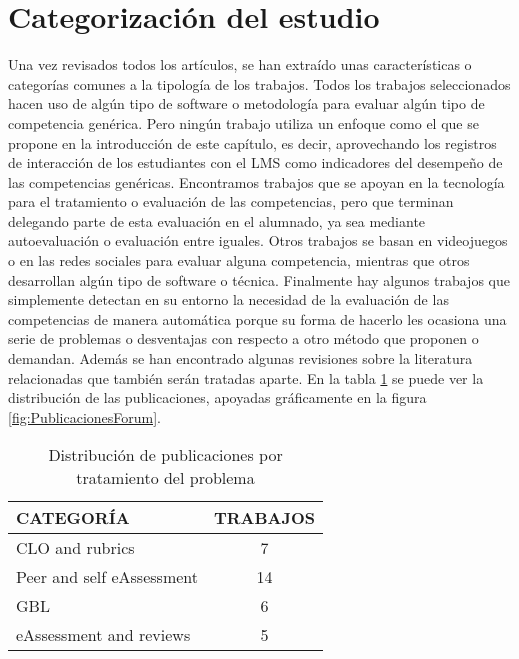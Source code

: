 \section{Categorización del estudio}

Una vez revisados todos los artículos, se han extraído unas características o categorías comunes a la tipología de los trabajos. Todos los trabajos seleccionados hacen uso de algún tipo de software o metodología para evaluar algún tipo de competencia genérica. Pero ningún trabajo utiliza un enfoque como el que se propone en la introducción de este capítulo, es decir, aprovechando los registros de interacción de los estudiantes con el LMS como indicadores del desempeño de las competencias genéricas. Encontramos trabajos que se apoyan en la tecnología para el tratamiento o evaluación de las competencias, pero que terminan delegando parte de esta evaluación en el alumnado, ya sea mediante autoevaluación o evaluación entre iguales. Otros trabajos se basan en videojuegos o en las redes sociales para evaluar alguna competencia, mientras que otros desarrollan algún tipo de software o técnica. Finalmente hay algunos trabajos que simplemente detectan en su entorno la necesidad de la evaluación de las competencias de manera automática porque su forma de hacerlo les ocasiona una serie de problemas o desventajas con respecto a otro método que proponen o demandan. Además se han encontrado algunas revisiones sobre la literatura relacionadas que también serán tratadas aparte.  En la tabla \ref{tab:PublicacionesForum} se puede ver la distribución de las publicaciones, apoyadas gráficamente en la figura  \ref{fig:PublicacionesForum}. 

\begin{table}[H]
  \begin{center}
  \begin{tabular}{| m{10cm} | c |}
    \hline
    CATEGORÍA & TRABAJOS\\
    \hline
    \hline 
    CLO and rubrics & 7\\
    \hline
    Peer and self eAssessment & 14\\
    \hline
    GBL & 6\\
    \hline
    eAssessment and reviews & 5\\
    \hline
  \end{tabular}
\end{center}
\caption{Distribución de publicaciones por tratamiento del problema}
\label{tab:PublicacionesForum}
\end{table} 

